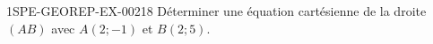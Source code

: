 \begin{exercice}{1SPE-GEOREP-EX-002}{1}{8}
Déterminer une équation cartésienne de la droite $(AB)$ avec $A(2 ; -1)$ et $B(2 ; 5)$.
\end{exercice}
